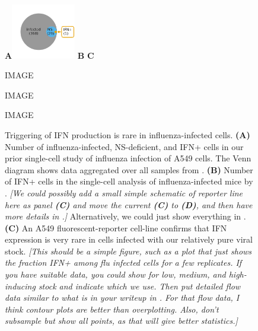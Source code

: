 \documentclass[9pt,lineno]{elife}
\newcommand{\jdbcomment}[1]{\emph{\color{red} [#1]}}
\begin{document}
\begin{figure}
\centerline{
{\bf \Large A}\includegraphics[width=0.25\textwidth,valign=t]{figures/IFN_stochastic/RussellVenn/venn_diagram.pdf}
{\bf \Large B}
{\bf \Large C}
}
\caption{
Triggering of IFN production is rare in influenza-infected cells.
{\bf (A)} Number of influenza-infected, NS-deficient, and IFN+ cells in our prior single-cell study of influenza infection of A549 cells.
The Venn diagram shows data aggregated over all samples from \citet{russell2018extreme}.
{\bf (B)} Number of IFN+ cells in the single-cell analysis of influenza-infected mice by \citep{steuerman2018dissection}.
\jdbcomment{We could possibly add a \emph{small simple} schematic of reporter line here as panel {\bf (C)} and move the current {\bf (C)} to {\bf (D)}, and then have more details in \FIGSUPP[IFNrare]{reporter_cells}.}
Alternatively, we could just show everything in .
{\bf (C)} An A549 fluorescent-reporter cell-line confirms that IFN expression is very rare in cells infected with our relatively pure viral stock.
\jdbcomment{This should be a simple figure, such as a plot that just shows the fraction IFN+ among flu infected cells for a few replicates.
If you have suitable data, you could show for low, medium, and high-inducing stock and indicate which we use.
Then put detailed flow data similar to what is in your writeup in \FIGSUPP[IFNrare]{flow}. For that flow data, I think contour plots are better than overplotting. Also, don't subsample but show all points, as that will give better statistics.}
}
\label{fig:IFNrare}

{IMAGE}
\label{figsupp:reporter_cells}

{IMAGE}
\label{figsupp:type_I_vs_III}

{IMAGE}
\label{figsupp:flow}

\end{figure}
\end{document}
